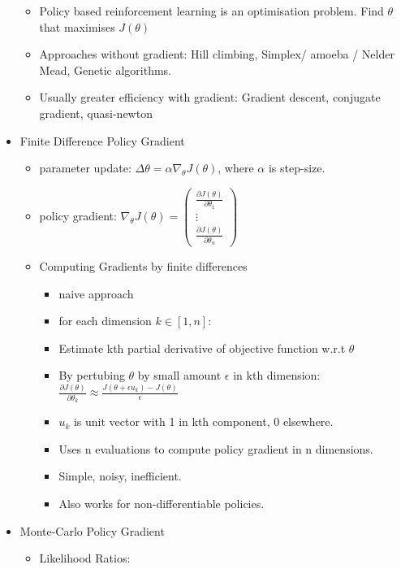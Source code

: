 \begin{itemize}[noitemsep,nolistsep]
\begin{itemize}[noitemsep,nolistsep]
		\item Policy based reinforcement learning is an optimisation problem. Find $\theta$ that maximises $J(\theta)$
		\item Approaches without gradient: Hill climbing, Simplex/ amoeba / Nelder Mead, Genetic algorithms.
		\item Usually greater efficiency with gradient: Gradient descent, conjugate gradient, quasi-newton
	\end{itemize}
	\item Finite Difference Policy Gradient
	\begin{itemize}[noitemsep,nolistsep]
		\item parameter update: $\Delta \theta = \alpha \nabla_\theta J(\theta)$, where $\alpha$ is step-size.
		\item policy gradient: $\nabla_\theta J(\theta) = \begin{pmatrix} \frac{\partial J(\theta)}{\partial \theta_1} \\ \vdots \\ \frac{\partial J(\theta)}{\partial \theta_n}\end{pmatrix}$
		\item Computing Gradients by finite differences
		\begin{itemize}[noitemsep,nolistsep]
			\item naive approach
			\item for each dimension $k \in [1,n]$:
			\item Estimate kth partial derivative of objective function w.r.t $\theta$
			\item By pertubing $\theta$ by small amount $\epsilon$ in kth dimension: $\frac{\partial J(\theta)}{\partial \theta_k} \approx \frac{J(\theta + \epsilon u_k) - J(\theta)}{\epsilon}$
			\item $u_k$ is unit vector with 1 in kth component, 0 elsewhere.
			\item Uses n evaluations to compute policy gradient in n dimensions.
			\item Simple, noisy, inefficient.
			\item Also works for non-differentiable policies.
		\end{itemize}
	\end{itemize}
	\item Monte-Carlo Policy Gradient
	\begin{itemize}[noitemsep,nolistsep]
		\item Likelihood Ratios:
		\begin{itemize}

\end{itemize}
\end{itemize}
\end{itemize}
